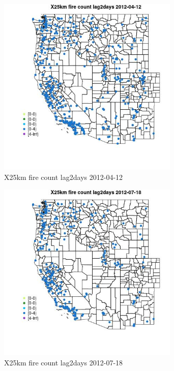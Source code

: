 \begin{figure} 
\centering  
\includegraphics[width=0.77\textwidth]{Code_Outputs/Report_ML_input_PM25_Step4_part_e_de_duplicated_aves_compiled_2019-05-14wNAs_MapObsX25km_fire_count_lag2days2012-04-12.jpg} 
\caption{\label{fig:Report_ML_input_PM25_Step4_part_e_de_duplicated_aves_compiled_2019-05-14wNAsMapObsX25km_fire_count_lag2days2012-04-12}X25km fire count lag2days 2012-04-12} 
\end{figure} 
 

\begin{figure} 
\centering  
\includegraphics[width=0.77\textwidth]{Code_Outputs/Report_ML_input_PM25_Step4_part_e_de_duplicated_aves_compiled_2019-05-14wNAs_MapObsX25km_fire_count_lag2days2012-07-18.jpg} 
\caption{\label{fig:Report_ML_input_PM25_Step4_part_e_de_duplicated_aves_compiled_2019-05-14wNAsMapObsX25km_fire_count_lag2days2012-07-18}X25km fire count lag2days 2012-07-18} 
\end{figure} 
 

